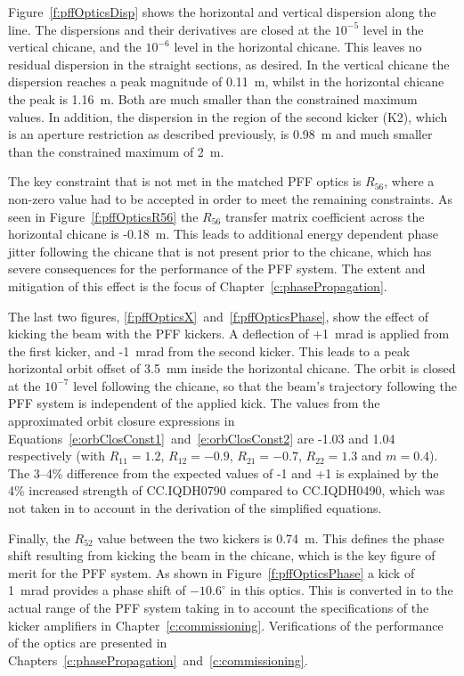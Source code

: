 Figure~\ref{f:pffOpticsDisp} shows the horizontal and vertical dispersion along the line. The dispersions and their derivatives are closed at the \(10^{-5}\) level in the vertical chicane, and the \(10^{-6}\) level in the horizontal chicane. This leaves no residual dispersion in the straight sections, as desired. In the vertical chicane the dispersion reaches a peak magnitude of 0.11~m, whilst in the horizontal chicane the peak is 1.16~m. Both are much smaller than the constrained maximum values. In addition, the dispersion in the region of the second kicker (K2), which is an aperture restriction as described previously, is 0.98~m and much smaller than the constrained maximum of 2~m.

The key constraint that is not met in the matched PFF optics is \(R_{56}\), where a non-zero value had to be accepted in order to meet the remaining constraints. As seen in Figure~\ref{f:pffOpticsR56} the \(R_{56}\) transfer matrix coefficient across the horizontal chicane is -0.18~m. This leads to additional energy dependent phase jitter following the chicane that is not present prior to the chicane, which has severe consequences for the performance of the PFF system. The extent and mitigation of this effect is the focus of Chapter~\ref{c:phasePropagation}.

The last two figures, \ref{f:pffOpticsX}~and~\ref{f:pffOpticsPhase}, show the effect of kicking the beam with the PFF kickers. A deflection of +1~mrad is applied from the first kicker, and -1~mrad from the second kicker. This leads to a peak horizontal orbit offset of 3.5~mm inside the horizontal chicane. The orbit is closed at the \(10^{-7}\) level following the chicane, so that the beam's trajectory following the PFF system is independent of the applied kick. The values from the approximated orbit closure expressions in Equations~\ref{e:orbClosConst1}~and~\ref{e:orbClosConst2} are -1.03 and 1.04 respectively (with \(R_{11} = 1.2\), \(R_{12} = -0.9\), \(R_{21} = -0.7\), \(R_{22} = 1.3\) and \(m = 0.4\)). The 3--4\% difference from the expected values of -1 and +1 is explained by the 4\% increased strength of CC.IQDH0790 compared to CC.IQDH0490, which was not taken in to account in the derivation of the simplified equations.

Finally, the \(R_{52}\) value between the two kickers is 0.74~m. This defines the phase shift resulting from kicking the beam in the chicane, which is the key figure of merit for the PFF system. As shown in Figure~\ref{f:pffOpticsPhase} a kick of 1~mrad provides a phase shift of \(-10.6^\circ\) in this optics. This is converted in to the actual range of the PFF system taking in to account the specifications of the kicker amplifiers in Chapter~\ref{c:commissioning}. Verifications of the performance of the optics are presented in Chapters~\ref{c:phasePropagation}~and~\ref{c:commissioning}.

